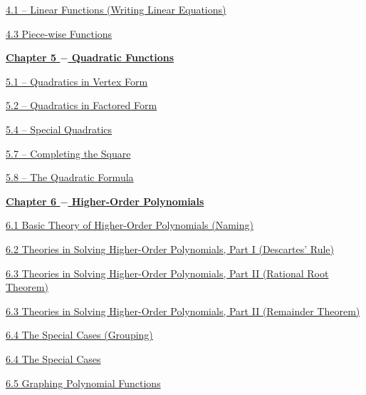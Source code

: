 \documentclass[../book.tex]{subfiles}
\begin{document}
\href{https://cdn.kutasoftware.com/Worksheets/Alg1/Writing%20Linear%20Equations.pdf}{4.1 – Linear Functions (Writing Linear Equations)}

\href{https://cdn.kutasoftware.com/Worksheets/Precalc/01%20-%20Piecewise%20Functions.pdf}{4.3   Piece-wise Functions}

\noindent \underline{\textbf{Chapter 5 $-$ Quadratic Functions}}

\href{https://cdn.kutasoftware.com/Worksheets/Alg2/Vertex%20Form%20of%20Parabolas.pdf}{5.1 – Quadratics in Vertex Form}

\href{https://cdn.kutasoftware.com/Worksheets/Alg2/Quadratic%20Equations%20By%20Factoring.pdf}{5.2 – Quadratics in Factored Form}

\href{https://cdn.kutasoftware.com/Worksheets/Alg1/Factoring%20Special%20Cases.pdf}{5.4 – Special Quadratics}

\href{https://cdn.kutasoftware.com/Worksheets/Alg2/Quadratic%20Equations%20By%20Completing%20the%20Square.pdf}{5.7 – Completing the Square}

\href{https://cdn.kutasoftware.com/Worksheets/Alg2/Quadratic%20Formula.pdf}{5.8 – The Quadratic Formula}

\noindent \underline{\textbf{Chapter 6 $-$ Higher-Order Polynomials}}

\href{https://cdn.kutasoftware.com/Worksheets/Alg1/Naming%20Polynomials.pdf}{6.1   Basic Theory of Higher-Order Polynomials (Naming)}

\href{https://cdn.kutasoftware.com/Worksheets/Alg2/Descartes%20Rule%20of%20Signs.pdf}{6.2   Theories in Solving Higher-Order Polynomials, Part I (Descartes' Rule)}

\href{https://cdn.kutasoftware.com/Worksheets/Alg2/Rational%20Root%20Theorem.pdf}{6.3   Theories in Solving Higher-Order Polynomials, Part II (Rational Root Theorem)}

\href{https://cdn.kutasoftware.com/Worksheets/Alg2/The%20Remainder%20Theorem.pdf}{6.3   Theories in Solving Higher-Order Polynomials, Part II (Remainder Theorem)}

\href{https://cdn.kutasoftware.com/Worksheets/Alg1/Factoring%20By%20Grouping.pdf}{6.4   The Special Cases (Grouping)}

\href{https://cdn.kutasoftware.com/Worksheets/Alg1/Factoring%20Special%20Cases.pdf}{6.4   The Special Cases}

\href{https://cdn.kutasoftware.com/Worksheets/Alg2/Graphing%20Polynomial%20Functions.pdf}{6.5  Graphing Polynomial Functions}
\end{document}
